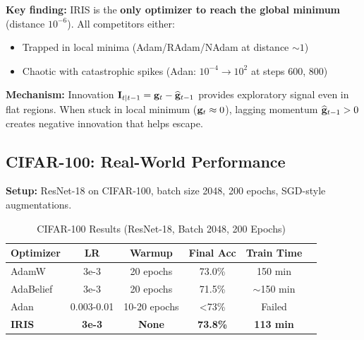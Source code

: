 
\textbf{Key finding:} IRIS is the \textbf{only optimizer to reach the global minimum} (distance $10^{-6}$). All competitors either:
\begin{itemize}
    \item Trapped in local minima (Adam/RAdam/NAdam at distance $\sim 1$)
    \item Chaotic with catastrophic spikes (Adan: $10^{-4} \to 10^2$ at steps 600, 800)
\end{itemize}

\textbf{Mechanism:} Innovation $\mathbf{I}_{t|t-1} = \mathbf{g}_t - \widehat{\mathbf{g}}_{t-1}$ provides exploratory signal even in flat regions. When stuck in local minimum ($\mathbf{g}_t \approx 0$), lagging momentum $\widehat{\mathbf{g}}_{t-1} > 0$ creates negative innovation that helps escape.

\subsection{CIFAR-100: Real-World Performance}

\textbf{Setup:} ResNet-18 on CIFAR-100, batch size 2048, 200 epochs, SGD-style augmentations.

\begin{table}[H]
\centering
\caption{CIFAR-100 Results (ResNet-18, Batch 2048, 200 Epochs)}
\label{tab:cifar100}
\begin{tabular}{@{}lccccc@{}}
\toprule
\textbf{Optimizer} & \textbf{LR} & \textbf{Warmup} & \textbf{Final Acc} & \textbf{Train Time} \\
\midrule
AdamW & 3e-3 & 20 epochs & 73.0\% & 150 min \\
AdaBelief & 3e-3 & 20 epochs & 71.5\% & $\sim$150 min \\
Adan & 0.003-0.01 & 10-20 epochs & <73\% & Failed \\
\midrule
\textbf{IRIS} & \textbf{3e-3} & \textbf{None} & \textbf{73.8\%} & \textbf{113 min} \\
\bottomrule
\end{tabular}
\end{table}


